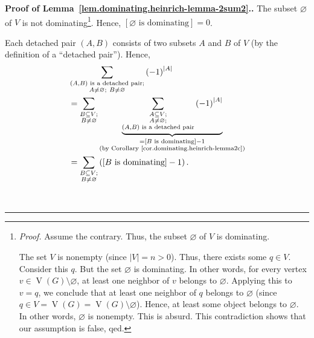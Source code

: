 \documentclass[numbers=enddot,12pt,final,onecolumn,notitlepage]{scrartcl}%
\theoremstyle{definition}
\newenvironment{proof}[1][Proof]{\noindent\textbf{#1.} }{\ \rule{0.5em}{0.5em}}
\let\sumnonlimits\sum
\renewcommand{\sum}{\sumnonlimits\limits}
\newcommand{\abs}[1]{\left| #1 \right|}
\newcommand{\tup}[1]{\left( #1 \right)}
\newcommand{\ive}[1]{\left[ #1 \right]}
\newcommand{\verts}[1]{\operatorname{V}\left( #1 \right)}
\begin{document}
\begin{proof}[Proof of
Lemma~\ref{lem.dominating.heinrich-lemma-2sum2}.]
The subset $\varnothing$ of $V$ is not
dominating\footnote{\textit{Proof.} Assume the contrary. Thus, the
subset $\varnothing$ of $V$ is dominating.

The set $V$ is nonempty (since $\abs{V} = n > 0$). Thus, there exists
some $q \in V$. Consider this $q$. But the set $\varnothing$ is
dominating. In other words, for every vertex
$v \in \verts{G} \setminus \varnothing$, at least one neighbor of
$v$ belongs to $\varnothing$. Applying this to $v = q$, we conclude
that at least one neighbor of $q$ belongs to $\varnothing$ (since
$q \in V = \verts{G} = \verts{G} \setminus \varnothing$). Hence, at
least some object belongs to $\varnothing$. In other words,
$\varnothing$ is nonempty. This is absurd. This contradiction shows
that our assumption is false, qed.}. Hence,
$\ive{\varnothing \text{ is dominating}} = 0$.

Each detached pair $\tup{A, B}$ consists of two subsets $A$ and $B$
of $V$ (by the definition of a ``detached pair''). Hence,
\begin{align}
& \sum_{\substack{\tup{A, B} \text{ is a detached pair}; \\
                A \neq \varnothing; \  B \neq \varnothing}}
  \tup{-1}^{\abs{A}} \nonumber \\
&=
\sum_{\substack{B \subseteq V; \\ B \neq \varnothing}}
\underbrace{
\sum_{\substack{A \subseteq V; \\ A \neq \varnothing; \\
                \tup{A, B} \text{ is a detached pair}}}
\tup{-1}^{\abs{A}}
}_{\substack{= \ive{B \text{ is dominating}} - 1 \\
        \text{(by Corollary~\ref{cor.dominating.heinrich-lemma2c})}}}
 \nonumber \\
&= \sum_{\substack{B \subseteq V; \\ B \neq \varnothing}}
\tup{\ive{B \text{ is dominating}} - 1} .
\label{pf.lem.dominating.heinrich-lemma-2sum2.3}
\end{align}


\end{proof}
\end{document}
